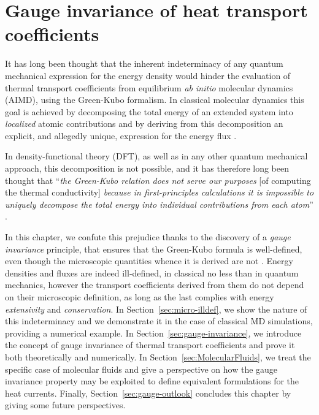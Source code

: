\chapter{Gauge invariance of heat transport coefficients} \label{ch:gauge-invariance}

It has long been thought that the inherent indeterminacy of any quantum mechanical expression for the energy density would hinder the evaluation of thermal transport coefficients from equilibrium \emph{ab initio} molecular dynamics (AIMD), using the Green-Kubo formalism.  
In classical molecular dynamics this goal is achieved by decomposing the total energy of an extended system into \emph{localized} atomic contributions and by deriving from this decomposition an explicit, and allegedly unique, expression for the energy flux \cite{Irving1950}.

In density-functional theory (DFT), as well as in any other quantum mechanical approach, this decomposition is not possible, and it has therefore long been thought that ``\emph{the Green-Kubo relation does not serve our purposes} [of computing the thermal conductivity] \emph{because in first-principles calculations it is impossible to uniquely decompose the total energy into individual contributions from each atom}'' \cite{Stackhouse2010b}. 

In this chapter, we confute this prejudice thanks to the discovery of a \emph{gauge invariance} principle, that ensures that the Green-Kubo formula is well-defined, even though the microscopic quantities whence it is derived are not \cite{Marcolongo2016,Ercole2016}. 
Energy densities and fluxes are indeed ill-defined, in classical no less than in quantum mechanics, however the transport coefficients derived from them do not depend on their microscopic definition, as long as the last complies with energy \emph{extensivity} and \emph{conservation}. 
In Section~\ref{sec:micro-illdef}, we show the nature of this indeterminacy and we demonstrate it in the case of classical MD simulations, providing a numerical example. 
In Section~\ref{sec:gauge-invariance}, we introduce the concept of gauge invariance of thermal transport coefficients and prove it both theoretically and numerically. 
In Section~\ref{sec:MolecularFluids}, we treat the specific case of molecular fluids and give a perspective on how the gauge invariance property may be exploited to define equivalent formulations for the heat currents. 
Finally, Section~\ref{sec:gauge-outlook} concludes this chapter by giving some future perspectives. 


